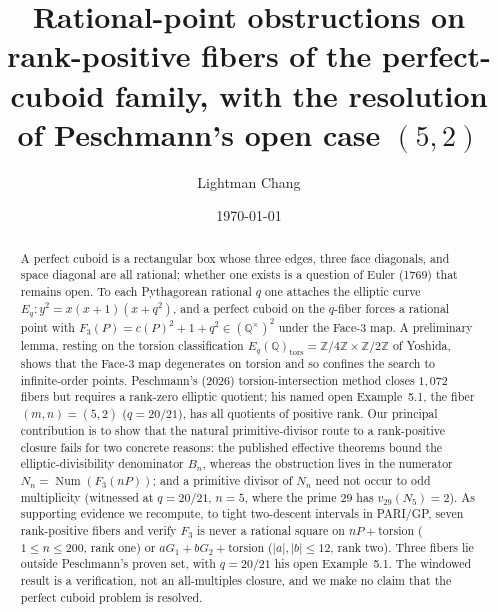 \documentclass[11pt,reqno]{amsart}
\theoremstyle{plain}
\theoremstyle{definition}
\newcommand{\Q}{\mathbb{Q}}
\newcommand{\Z}{\mathbb{Z}}
\DeclareMathOperator{\Num}{Num}
\begin{document}
\title[Rank-positive cuboid fibers and Peschmann's case (5,2)]{Rational-point obstructions on rank-positive fibers of the
perfect-cuboid family, with the resolution of Peschmann's open case
\texorpdfstring{$(5,2)$}{(5,2)}}

\author{Lightman Chang}
\address{Independent Researcher}


\date{\today}

\begin{abstract}
A perfect cuboid is a rectangular box whose three edges, three face diagonals,
and space diagonal are all rational; whether one exists is a question of Euler
(1769) that remains open. To each Pythagorean rational $q$ one attaches the
elliptic curve $E_q\colon y^2=x(x+1)(x+q^2)$, and a perfect cuboid on the
$q$-fiber forces a rational point with $F_3(P)=c(P)^2+1+q^2\in(\Q^\times)^2$
under the Face-3 map. A preliminary lemma, resting on the torsion classification
$E_q(\Q)_{\mathrm{tors}}=\Z/4\Z\times\Z/2\Z$ of Yoshida, shows that the Face-3
map degenerates on torsion and so confines the search to infinite-order points.
Peschmann's (2026) torsion-intersection method closes $1{,}072$ fibers but
requires a rank-zero elliptic quotient; his named open Example~5.1, the fiber
$(m,n)=(5,2)$ ($q=20/21$), has all quotients of positive rank. Our principal
contribution is to show that the natural primitive-divisor route to a
rank-positive closure fails for two concrete reasons: the published effective
theorems bound the elliptic-divisibility denominator $B_n$, whereas the
obstruction lives in the numerator $N_n=\Num(F_3(nP))$; and a primitive divisor
of $N_n$ need not occur to odd multiplicity (witnessed at $q=20/21$, $n=5$, where
the prime $29$ has $v_{29}(N_5)=2$). As supporting evidence we recompute, to
tight two-descent intervals in PARI/GP, seven rank-positive fibers and verify
$F_3$ is never a rational square on $nP+\text{torsion}$ ($1\le n\le 200$, rank
one) or $aG_1+bG_2+\text{torsion}$ ($|a|,|b|\le 12$, rank two). Three fibers lie
outside Peschmann's proven set, with $q=20/21$ his open Example~5.1. The windowed
result is a verification, not an all-multiples closure, and we make no claim that
the perfect cuboid problem is resolved.
\end{abstract}
\end{document}
